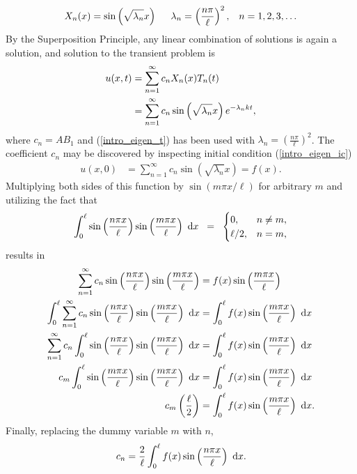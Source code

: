 \begin{align}
  \label{intro_eigen_x}
  X_n(x) = \sin\left( \sqrt{\lambda_n} x \right) \hspace{5mm}
  \lambda_n = \left( \frac{n \pi}{\ell} \right)^2, &&n = 1,2,3,\dots
\end{align}
By the Superposition Principle, any linear combination of solutions is again a solution, and solution to the transient problem is
\begin{align}
  u(x,t) &= \sum_{n=1}^{\infty} c_n X_n(x) T_n(t) \notag \\
  \label{intro_eigen_fourier_soln}
         &= \sum_{n=1}^{\infty} c_n \sin\left( \sqrt{\lambda_n} x \right) e^{-\lambda_n k t},
\end{align}
where $c_n = A B_1$ and (\ref{intro_eigen_t}) has been used with $\lambda_n = \left( \frac{n \pi}{\ell} \right)^2$.  The coefficient $c_n$ may be discovered by inspecting initial condition (\ref{intro_eigen_ic})
\begin{align*}
  u(x,0) &= \sum_{n=1}^{\infty} c_n \sin\left( \sqrt{\lambda_n} x \right) = f(x).
\end{align*}
Multiplying both sides of this function by $\sin(m\pi x/\ell)$ for arbitrary $m$ and utilizing the fact that
\begin{align*}
  \int_{0}^{\ell} \sin\left(\frac{n\pi x}{\ell}\right) \sin\left(\frac{m\pi x}{\ell}\right) \ \mathrm{d}x \hspace{2mm} = \hspace{2mm}
  \begin{cases}
    0,      & n \neq m, \\
    \ell/2, & n = m,
  \end{cases}
\end{align*}
results in
{\footnotesize
\begin{align*}
  \sum_{n=1}^{\infty} c_n \sin\left( \frac{n\pi x}{\ell} \right) \sin\left(\frac{m\pi x}{\ell} \right) &= f(x) \sin\left( \frac{m\pi x}{\ell} \right) \\
  \int_{0}^{\ell} \sum_{n=1}^{\infty} c_n \sin\left( \frac{n\pi x}{\ell} \right) \sin\left(\frac{m\pi x}{\ell} \right) \ \mathrm{d}x &= \int_{0}^{\ell} f(x) \sin\left( \frac{m\pi x}{\ell} \right) \ \mathrm{d}x \\
  \sum_{n=1}^{\infty} c_n \int_{0}^{\ell} \sin\left( \frac{n\pi x}{\ell} \right) \sin\left(\frac{m\pi x}{\ell} \right) \ \mathrm{d}x &= \int_{0}^{\ell} f(x) \sin\left( \frac{m\pi x}{\ell} \right) \ \mathrm{d}x \\
  c_m \int_{0}^{\ell} \sin\left( \frac{m\pi x}{\ell} \right) \sin\left(\frac{m\pi x}{\ell} \right) \ \mathrm{d}x &= \int_{0}^{\ell} f(x) \sin\left( \frac{m\pi x}{\ell} \right) \ \mathrm{d}x \\
  c_m \left( \frac{\ell}{2} \right) &= \int_{0}^{\ell} f(x) \sin\left( \frac{m\pi x}{\ell} \right) \ \mathrm{d}x.
\end{align*}}
Finally, replacing the dummy variable $m$ with $n$,
\begin{align}
  \label{intro_eigen_fourier_coef}
  c_n = \frac{2}{\ell} \int_{0}^{\ell} f(x) \sin\left( \frac{n\pi x}{\ell} \right) \ \mathrm{d}x.
\end{align}

